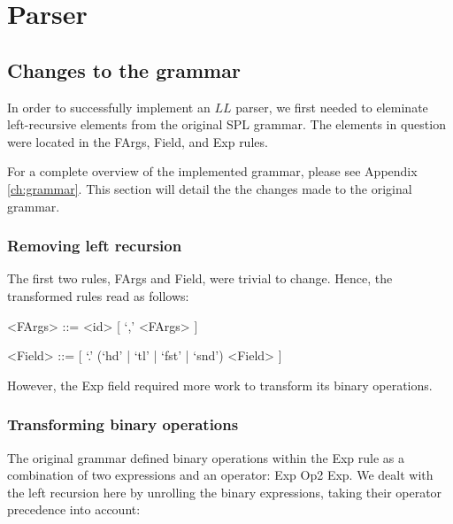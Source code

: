 \chapter{Parser}

\section{Changes to the grammar}

In order to successfully implement an $LL$ parser, we first needed to eleminate left-recursive elements from the original SPL grammar.
The elements in question were located in the \textsf{FArgs}, \textsf{Field}, and \textsf{Exp} rules.

For a complete overview of the implemented grammar, please see Appendix \ref{ch:grammar}.
This section will detail the the changes made to the original grammar.

\subsection{Removing left recursion}

The first two rules, \textsf{FArgs} and \textsf{Field}, were trivial to change.
Hence, the transformed rules read as follows:

\begin{framed}
	\begin{grammar}
	<FArgs> ::= <id> [ `,' <FArgs> ]

	<Field> ::= [ `.' (`hd' | `tl' | `fst' | `snd') <Field> ]
	\end{grammar}
\end{framed}

However, the \textsf{Exp} field required more work to transform its binary operations.

\subsection{Transforming binary operations}

The original grammar defined binary operations within the \textsf{Exp} rule as a combination of two expressions and an operator: \textsf{Exp} \textsf{Op2} \textsf{Exp}.
We dealt with the left recursion here by unrolling the binary expressions, taking their operator precedence into account:

